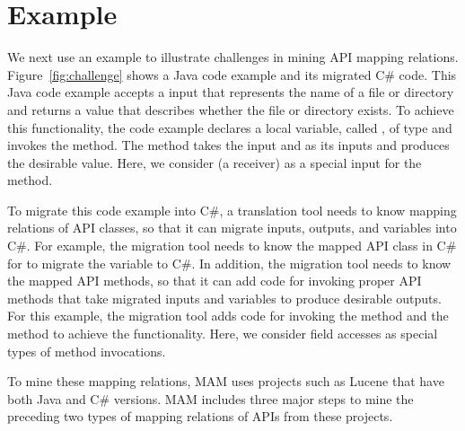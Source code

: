 \section{Example}
\label{sec:example}

We next use an example to illustrate challenges in mining
API mapping relations. Figure~\ref{fig:challenge} shows a
Java code example and its migrated C\# code. This Java code
example accepts a  input that represents the name of a
file or directory and returns a  value that
describes whether the file or directory exists. To achieve this functionality, the
code example declares a local variable, called , of
type  and invokes the  method. The
method takes the  input and  as its
inputs and produces the desirable  value. Here, we
consider  (a receiver) as a special input for
the  method.

To migrate this code example into C\#, a translation tool needs to
know mapping relations of API classes, so that it can migrate inputs,
outputs, and variables into C\#. For example, the  migration tool
needs to know the mapped API class in C\# for 
to migrate the variable  to C\#. In addition, the
migration tool needs to know the mapped API methods, so that it can
add code for invoking proper API methods that take migrated inputs and variables to
produce desirable outputs. For this example, the migration tool
adds code for invoking the  method and the
 method to achieve the functionality.
Here, we consider field accesses as special types of method invocations.

To mine these mapping relations, MAM uses projects such as Lucene
that have both Java and C\# versions. MAM includes three major steps
to mine the preceding two types of mapping relations of APIs from these projects.

